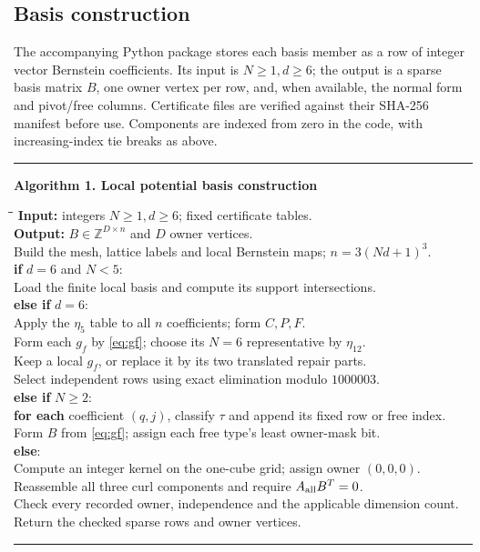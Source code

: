 \documentclass[11pt]{article}
\theoremstyle{remark}
\newcommand{\Z}{\mathbb Z}
\begin{document}
\subsection{Basis construction}

The accompanying Python package stores each basis member as a row of
integer vector Bernstein coefficients. Its input is $N\ge1,d\ge6$;
the output is a sparse basis matrix $B$, one owner vertex per row,
and, when available, the normal form and pivot/free columns. Certificate
files are verified against their SHA-256 manifest before use. Components
are indexed from zero in the code, with increasing-index tie breaks as above.

\begin{center}
\begin{minipage}{.96\textwidth}
\hrule\smallskip
\textbf{Algorithm 1. Local potential basis construction}\par\smallskip
\begin{tabbing}
\quad\=\quad\=\quad\=\kill
\textbf{Input:} integers $N\ge1,d\ge6$; fixed certificate tables.\\
\textbf{Output:} $B\in\Z^{D\times n}$ and $D$ owner vertices.\\
Build the mesh, lattice labels and local Bernstein maps; $n=3(Nd+1)^3$.\\
\textbf{if} $d=6$ and $N<5$:\\
\>Load the finite local basis and compute its support intersections.\\
\textbf{else if} $d=6$:\\
\>Apply the $\eta_5$ table to all $n$ coefficients; form $C,P,F$.\\
\>Form each $g_f$ by \eqref{eq:gf}; choose its $N=6$ representative by $\eta_{12}$.\\
\>Keep a local $g_f$, or replace it by its two translated repair parts.\\
\>Select independent rows using exact elimination modulo $1000003$.\\
\textbf{else if} $N\ge2$:\\
\>\textbf{for each} coefficient $(q,j)$, classify $\tau$ and append its fixed row or free index.\\
\>Form $B$ from \eqref{eq:gf}; assign each free type's least owner-mask bit.\\
\textbf{else}:\\
\>Compute an integer kernel on the one-cube grid; assign owner $(0,0,0)$.\\
Reassemble all three curl components and require $A_{\rm all}B^T=0$.\\
Check every recorded owner, independence and the applicable dimension count.\\
Return the checked sparse rows and owner vertices.
\end{tabbing}
\smallskip\hrule
\end{minipage}
\end{center}
\end{document}
